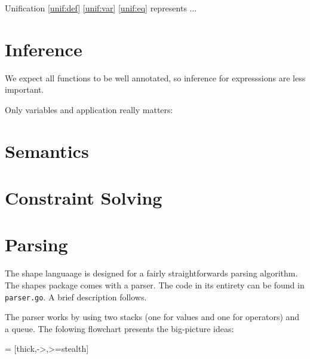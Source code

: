 \documentclass{article}
\begin{document}
Unification \ref{unif:def} \ref{unif:var} \ref{unif:eq} represents ...

\section{Inference}

We expect all functions to be well annotated, so inference for expresssions are less important.

Only variables and application really matters:

\begin{prooftree}
\end{prooftree}

\begin{prooftree}
\end{prooftree}



\section{Semantics}

\section{Constraint Solving}

\section{Parsing}
The shape languaage is designed for a fairly straightforwards parsing algorithm. The shapes package comes with a parser. The code in its entirety can be found in \texttt{parser.go}. A brief description follows.

The parser works by using two stacks (one for values and one for operators) and a queue. The folowing flowchart presents the big-picture ideas:

 = [thick,->,>=stealth]

\end{document}
